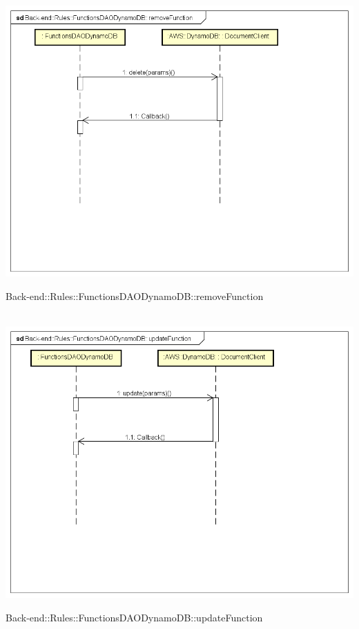 \\ \includegraphics[width=\textwidth,height=\textheight,keepaspectratio]{images/diagrams/back-end/Ufficial_Backend/Back-end__Rules__FunctionsDAODynamoDB__removeFunction.png} 	\caption{Back-end::Rules::FunctionsDAODynamoDB::removeFunction}
\\ \includegraphics[width=\textwidth,height=\textheight,keepaspectratio]{images/diagrams/back-end/Ufficial_Backend/Back-end__Rules__FunctionsDAODynamoDB__updateFunction.png} 	\caption{Back-end::Rules::FunctionsDAODynamoDB::updateFunction}
